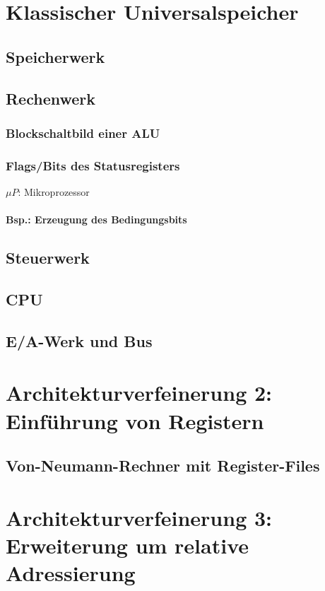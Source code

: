 \section{Klassischer Universalspeicher}
\subsection{Speicherwerk}
\subsection{Rechenwerk}
\subsubsection{Blockschaltbild einer ALU}
\subsubsection{Flags/Bits des Statusregisters}
$\mu P$: Mikroprozessor
\paragraph{Bsp.: Erzeugung des Bedingungsbits}
\subsection{Steuerwerk}
\subsection{CPU}
\subsection{E/A-Werk und Bus}

\section{Architekturverfeinerung 2: Einführung von Registern}

\subsection{Von-Neumann-Rechner mit Register-Files}

\section{Architekturverfeinerung 3: Erweiterung um relative Adressierung}

